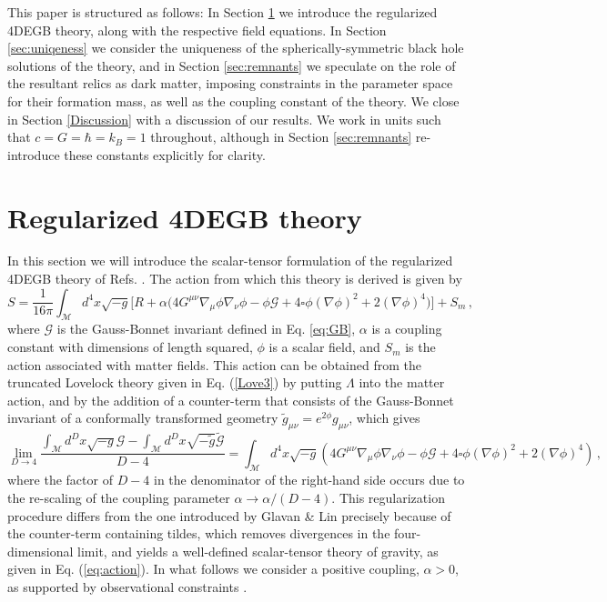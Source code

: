 \documentclass[reprint,amsmath,amssymbGaps,onecolumn,notitlepage,nofootinbib]{revtex4-1}
\newcommand{\br}[1]{\left(#1\right)}
\begin{document}
\par This paper is structured as follows: In Section \ref{S2} we introduce the regularized 4DEGB theory, along with the respective field equations. In Section \ref{sec:uniqeness} we consider the uniqueness of the spherically-symmetric black hole solutions of the theory, and in Section \ref{sec:remnants} we speculate on the role of the resultant relics as dark matter, imposing constraints in the parameter space for their formation mass, as well as the coupling constant of the theory. We close in Section \ref{Discussion} with a discussion of our results.  We work in units such that $c=G=\hbar=k_B=1$ throughout, although in Section \ref{sec:remnants} re-introduce these constants explicitly for clarity.

\section{Regularized 4DEGB theory} \label{S2}

In this section we will introduce the scalar-tensor formulation of the regularized 4DEGB theory of Refs. \cite{Fernandes:2020nbq,Hennigar:2020lsl,Lu:2020iav,Kobayashi:2020wqy}. The action from which this theory is derived is given by
\begin{equation}
S=\frac{1}{16\pi} \int_{\mathcal{M}} d^{4} x \sqrt{-g}\Big[R+\alpha \big(4 G^{\mu \nu} \nabla_{\mu} \phi \nabla_{\nu} \phi-\phi \mathcal{G}+4 \square \phi(\nabla \phi)^{2}+2(\nabla \phi)^{4}\big) \Big] + S_m \,,
\label{eq:action}
\end{equation}
where $\mathcal{G}$ is the Gauss-Bonnet invariant defined in Eq. \eqref{eq:GB}, $\alpha$ is a coupling constant with dimensions of length squared, $\phi$ is a scalar field, and $S_{m}$ is the action associated with matter fields. This action can be obtained from the truncated Lovelock theory given in Eq. (\ref{Love3}) by putting $\Lambda$ into the matter action, and by the addition of a counter-term that consists of the Gauss-Bonnet invariant of a conformally transformed geometry $\tilde{g}_{\mu \nu}=e^{2\phi} g_{\mu \nu}$, which gives \cite{Fernandes:2020nbq,Hennigar:2020lsl}
\begin{equation}
 \lim_{D \to 4} \frac{\int_{\mathcal{M}} d^{D} x \sqrt{-g} \mathcal{G}-\int_{\mathcal{M}} d^{D} x \sqrt{-\tilde{g}} \tilde{\mathcal{G}}}{D-4} =     \int_{\mathcal{M}} d^{4} x \sqrt{-g} \br{4 G^{\mu \nu} \nabla_{\mu} \phi \nabla_{\nu} \phi-\phi \mathcal{G}+4 \square \phi(\nabla \phi)^{2}+2(\nabla \phi)^{4}} \, ,
\end{equation}
where the factor of $D-4$ in the denominator of the right-hand side occurs due to the re-scaling of the coupling parameter $\alpha\rightarrow\alpha/(D-4)$. This regularization procedure differs from the one introduced by Glavan \& Lin precisely because of the counter-term containing tildes, which removes divergences in the four-dimensional limit, and yields a well-defined scalar-tensor theory of gravity, as given in Eq. (\ref{eq:action}). In what follows we consider a positive coupling, $\alpha >0$, as supported by observational constraints \cite{Clifton:2020xhc}.
\end{document}
